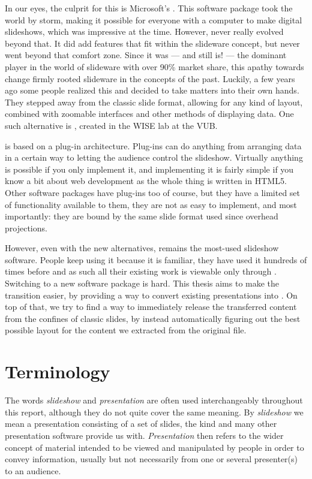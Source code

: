   In our eyes, the culprit for this is Microsoft's \ppt. This software package
  took the world by storm, making it possible for everyone with a computer to
  make digital slideshows, which was impressive at the time. However, \ppt*
  never really evolved beyond that. It did add features that fit within the
  slideware concept, but never went beyond that comfort zone. Since it was ---
  and still is! --- the dominant player in the world of slideware with over
  90\% market share, this apathy towards change firmly rooted slideware in the
  concepts of the past. Luckily, a few years ago some people realized this and
  decided to take matters into their own hands. They stepped away from the
  classic slide format, allowing for any kind of layout, combined with zoomable
  interfaces and other methods of displaying data. One such alternative is
  \mxp, created in the WISE lab at the VUB.

  \mxp is based on a plug-in architecture. Plug-ins can do anything from
  arranging data in a certain way to letting the audience control the
  slideshow. Virtually anything is possible if you only implement it, and
  implementing it is fairly simple if you know a bit about web development as
  the whole thing is written in HTML5. Other software packages have plug-ins
  too of course, but they have a limited set of functionality available to
  them, they are not as easy to implement, and most importantly: they are bound
  by the same slide format used since overhead projections.

  However, even with the new alternatives, \ppt* remains the most-used slideshow
  software. People keep using it because it is familiar, they have used it
  hundreds of times before and as such all their existing work is viewable only
  through \ppt. Switching to a new software package is hard. This thesis aims
  to make the transition easier, by providing a way to convert existing \ppt
  presentations into \mxp. On top of that, we try to find a way to immediately
  release the transferred content from the confines of classic slides, by
  instead automatically figuring out the best possible layout for the content
  we extracted from the original \ppt file.

  \section{Terminology}


   The words \emph{slideshow} and \emph{presentation} are often used
   interchangeably throughout this report, although they do not quite cover the
   same meaning. By \emph{slideshow} we mean a presentation consisting of a set
   of slides, the kind \ppt* and many other presentation software provide us
   with. \emph{Presentation} then refers to the wider concept of material
   intended to be viewed and manipulated by people in order to convey
   information, usually but not necessarily from one or several presenter(s) to
   an audience.

